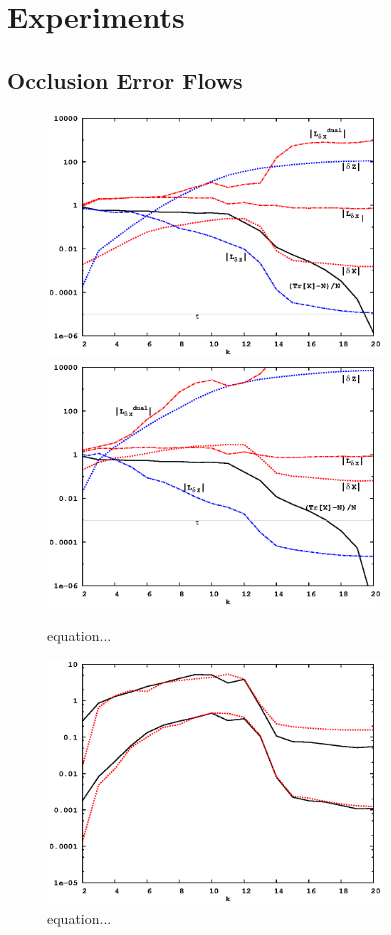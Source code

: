 \documentclass[letterpaper,twocolumn,amsmath,amsfont,amssymb,english,aps,jcp,preprintnumbers,groupaddress,nofootinbib,tightenlines]{revtex4}
\begin{document}
\section{Experiments}

\subsection{Occlusion Error Flows}
\begin{figure}[h]
  \caption{equation...}
 \includegraphics[width=3.5in]{8x_33_nanotube_cond10_tau-5.eps}
 \includegraphics[width=3.5in]{8x_33_nanotube_cond10_tau-3.eps}
\end{figure}
\begin{figure}[h]
  \caption{equation...}
 \includegraphics[width=3.5in]{8x_33_nanotube_cond10_compare_errors.eps}
\end{figure}
\end{document}
